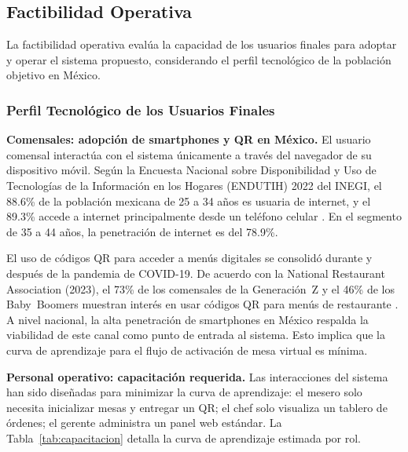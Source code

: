 \FloatBarrier
\subsection{Factibilidad Operativa}

La factibilidad operativa evalúa la capacidad de los usuarios finales para
adoptar y operar el sistema propuesto, considerando el perfil tecnológico de
la población objetivo en México.

\subsubsection{Perfil Tecnológico de los Usuarios Finales}

\noindent\textbf{Comensales: adopción de smartphones y QR en México.}
El usuario comensal interactúa con el sistema únicamente a través del navegador
de su dispositivo móvil. Según la Encuesta Nacional sobre Disponibilidad y Uso de
Tecnologías de la Información en los Hogares (ENDUTIH) 2022 del INEGI, el 88.6\%
de la población mexicana de 25 a 34 años es usuaria de internet, y el 89.3\%
accede a internet principalmente desde un teléfono celular \cite{inegi_endutih_2022}. En el segmento de
35 a 44 años, la penetración de internet es del 78.9\%.

El uso de c\'odigos QR para acceder a men\'us digitales se consolid\'o durante
y despu\'es de la pandemia de COVID-19. De acuerdo con la National Restaurant
Association (2023), el 73\% de los comensales de la Generaci\'on~Z y el 46\%
de los Baby~Boomers muestran inter\'es en usar c\'odigos QR para men\'us de
restaurante \cite{nra_state_2023}. A nivel nacional, la alta penetraci\'on de smartphones en
M\'exico \cite{inegi_endutih_2022} respalda la viabilidad de este canal como punto de entrada al sistema.
Esto implica que la curva de aprendizaje para el flujo de activaci\'on de mesa
virtual es m\'inima.

\noindent\textbf{Personal operativo: capacitación requerida.}
Las interacciones del sistema han sido diseñadas para minimizar la curva de
aprendizaje: el mesero solo necesita inicializar mesas y entregar un QR; el chef
solo visualiza un tablero de órdenes; el gerente administra un panel web estándar.
La Tabla~\ref{tab:capacitacion} detalla la curva de aprendizaje estimada por rol.

